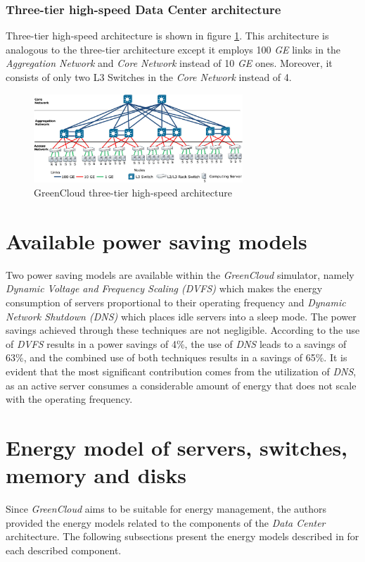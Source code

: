\subsubsection{Three-tier high-speed Data Center architecture}
Three-tier high-speed architecture is shown in figure \ref{fig:greencloud_threetierhs}. This architecture is analogous to the three-tier architecture except it employs 100 \emph{GE} links in the \emph{Aggregation Network} and \emph{Core Network} instead of 10 \emph{GE} ones. Moreover, it consists of only two L3 Switches in the \emph{Core Network} instead of 4.
\begin{figure}[h]
    \centering
    \includegraphics[width=0.7\textwidth]{chapters/images/greencloud_threetierhs.png}
    \caption{GreenCloud three-tier high-speed architecture}
    \label{fig:greencloud_threetierhs}
\end{figure}

\section{Available power saving models}
Two power saving models are available within the \emph{GreenCloud} simulator, namely \emph{Dynamic Voltage and Frequency Scaling (DVFS)} which makes the energy consumption of servers proportional to their operating frequency and \emph{Dynamic Network Shutdown (DNS)} which places idle servers into a sleep mode. The power savings achieved through these techniques are not negligible. According to \cite{kliazovich2012greencloud} the use of \emph{DVFS} results in a power savings of 4\%, the use of \emph{DNS} leads to a savings of 63\%, and the combined use of both techniques results in a savings of 65\%. It is evident that the most significant contribution comes from the utilization of \emph{DNS}, as an active server consumes a considerable amount of energy that does not scale with the operating frequency.

\section{Energy model of servers, switches, memory and disks}
Since \emph{GreenCloud} aims to be suitable for energy management, the authors provided the energy models related to the components of the \emph{Data Center} architecture. The following subsections present the energy models described in \cite{kliazovich2012greencloud} for each described component.
